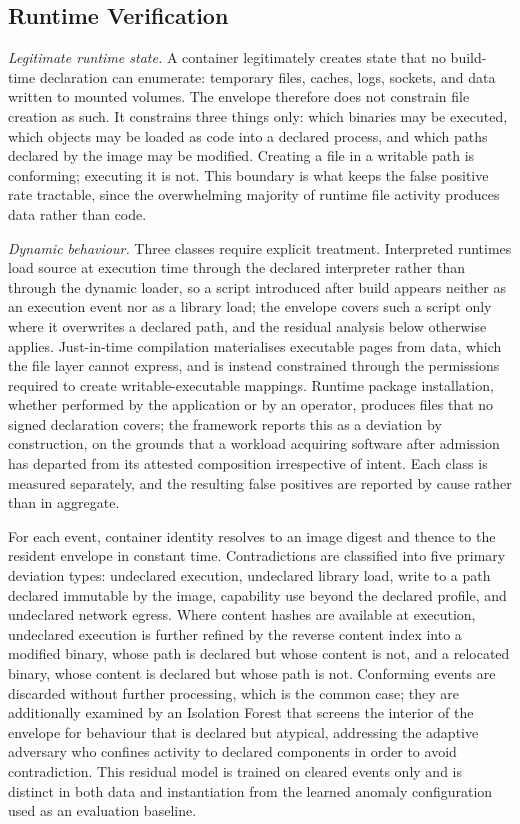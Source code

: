 \documentclass[conference]{IEEEtran}
\begin{document}
\subsection{Runtime Verification}

\textit{Legitimate runtime state.} A container legitimately creates
state that no build-time declaration can enumerate: temporary files,
caches, logs, sockets, and data written to mounted volumes. The envelope
therefore does not constrain file creation as such. It constrains three
things only: which binaries may be executed, which objects may be loaded
as code into a declared process, and which paths declared by the image
may be modified. Creating a file in a writable path is conforming;
executing it is not. This boundary is what keeps the false positive rate
tractable, since the overwhelming majority of runtime file activity
produces data rather than code.

\textit{Dynamic behaviour.} Three classes require explicit treatment.
Interpreted runtimes load source at execution time through the declared
interpreter rather than through the dynamic loader, so a script
introduced after build appears neither as an execution event nor as a
library load; the envelope covers such a script only where it overwrites
a declared path, and the residual analysis below otherwise applies.
Just-in-time compilation materialises executable pages from data, which
the file layer cannot express, and is instead constrained through the
permissions required to create writable-executable mappings. Runtime
package installation, whether performed by the application or by an
operator, produces files that no signed declaration covers; the
framework reports this as a deviation by construction, on the grounds
that a workload acquiring software after admission has departed from its
attested composition irrespective of intent. Each class is measured
separately, and the resulting false positives are reported by cause
rather than in aggregate.

For each event, container identity resolves to an image digest and
thence to the resident envelope in constant time. Contradictions are
classified into five primary deviation types: undeclared execution,
undeclared library load, write to a path declared immutable by the
image, capability use beyond the declared profile, and undeclared
network egress. Where content hashes are available at execution,
undeclared execution is further refined by the reverse content index
into a modified binary, whose path is declared but whose content is
not, and a relocated binary, whose content is declared but whose path
is not. Conforming events are discarded without further processing,
which is the common case; they are additionally examined by an Isolation
Forest \cite{isoforest2008} that screens the interior of the envelope
for behaviour that is declared but atypical, addressing the adaptive
adversary who confines activity to declared components in order to avoid
contradiction. This residual model is trained on cleared events only and
is distinct in both data and instantiation from the learned anomaly
configuration used as an evaluation baseline.
\end{document}
